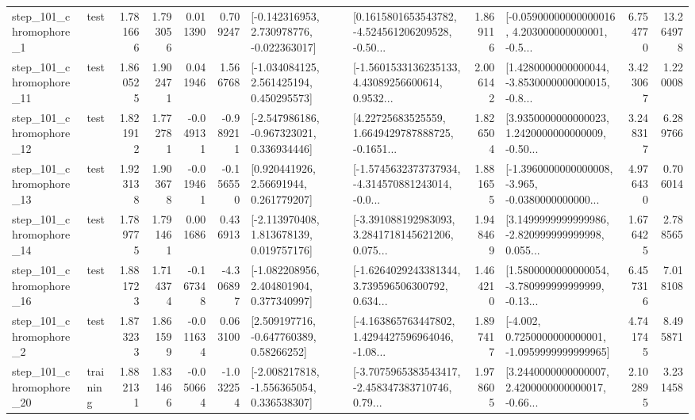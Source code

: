 \begin{tabular}{llrrrrllrlrr}
   step\_101\_chromophore\_1 &      test &      1.781666 &    1.793056 &      0.011390 &  0.709247 &   [-0.142316953, 2.730978776, -0.022363017] &  [0.1615801653543782, -4.524561206209528, -0.50... &       1.869116 &  [-0.05900000000000016, 4.203000000000001, -0.5... &            6.754770 &         13.264978 \\
  step\_101\_chromophore\_11 &      test &      1.860525 &    1.902471 &      0.041946 &  1.566768 &    [-1.034084125, 2.561425194, 0.450295573] &  [-1.5601533136235133, 4.43089256600614, 0.9532... &       2.006142 &  [1.4280000000000044, -3.8530000000000015, -0.8... &            3.423067 &          1.220008 \\
  step\_101\_chromophore\_12 &      test &      1.821912 &    1.772781 &     -0.049131 & -0.989211 &   [-2.547986186, -0.967323021, 0.336934446] &  [4.22725683525559, 1.6649429787888725, -0.1651... &       1.826504 &  [3.9350000000000023, 1.2420000000000009, -0.50... &            3.248317 &          6.289766 \\
  step\_101\_chromophore\_13 &      test &      1.923138 &    1.903678 &     -0.019461 & -0.156550 &      [0.920441926, 2.56691944, 0.261779207] &  [-1.5745632373737934, -4.314570881243014, -0.0... &       1.881655 &  [-1.3960000000000008, -3.965, -0.0380000000000... &            4.976430 &          0.706014 \\
  step\_101\_chromophore\_14 &      test &      1.789775 &    1.791461 &      0.001686 &  0.436913 &    [-2.113970408, 1.813678139, 0.019757176] &  [-3.391088192983093, 3.2841718145621206, 0.075... &       1.948469 &  [3.1499999999999986, -2.820999999999998, 0.055... &            1.676425 &          2.788565 \\
  step\_101\_chromophore\_16 &      test &      1.881723 &    1.714374 &     -0.167348 & -4.306897 &    [-1.082208956, 2.404801904, 0.377340997] &  [-1.6264029243381344, 3.739596506300792, 0.634... &       1.464210 &  [1.5800000000000054, -3.780999999999999, -0.13... &            6.457316 &          7.018108 \\
   step\_101\_chromophore\_2 &      test &      1.873233 &    1.861599 &     -0.011634 &  0.063100 &     [2.509197716, -0.647760389, 0.58266252] &  [-4.163865763447802, 1.4294427596964046, -1.08... &       1.897417 &  [-4.002, 0.7250000000000001, -1.0959999999999965] &            4.741745 &          8.495871 \\
  step\_101\_chromophore\_20 &  training &      1.882131 &    1.831466 &     -0.050664 & -1.032254 &   [-2.008217818, -1.556365054, 0.336538307] &  [-3.7075965383543417, -2.458347383710746, 0.79... &       1.978605 &  [3.2440000000000007, 2.4200000000000017, -0.66... &            2.102895 &          3.231458 \\

\end{tabular}
